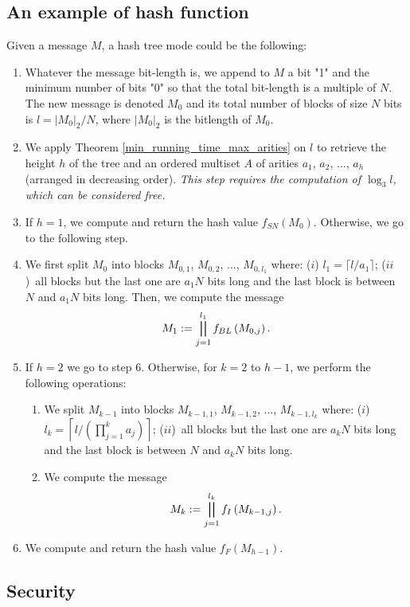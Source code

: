 \documentclass{llncs}
\begin{document}
\subsection{An example of hash function}
Given a message $M$, a hash tree mode could be the following:
\begin{enumerate}
 \item Whatever the message bit-length is, we append to $M$ a bit "1" and the minimum number of bits "0" so that the total bit-length is a multiple
 of $N$. The new message is denoted $M_0$ and its total number of blocks of size $N$ bits is $l=|M_0|_2/N$, where
 $|M_0|_2$ is the bitlength of $M_0$. 
\item We apply Theorem \ref{min_running_time_max_arities} on $l$ to retrieve the height 
 $h$ of the tree and an ordered multiset $A$ of arities $a_1$, $a_2$, ..., $a_h$ (arranged in decreasing order).
 \emph{This step requires the computation of $\log_3 l$, which can be considered free.}
 \item If $h=1$, we compute and return the hash value $f_{SN}(M_0)$. Otherwise, we go to the following step.
 \item We first split $M_0$ into blocks $M_{0,1}$, $M_{0,2}$, ..., $M_{0,l_1}$ where: ($i$) $l_1=\lceil l/a_1 \rceil$; ($ii$)~all blocks but the last one are
$a_1N$ bits long and the last block is between $N$ and $a_1N$ bits long.
 Then, we compute the message
 \[M_1:= \bigparallel_{j=1}^{l_1} f_{BL}\left(M_{0,j}\right).\]
 \item If $h=2$ we go to step 6. Otherwise, for $k=2$ to $h-1$, we perform the following operations:
 \begin{enumerate}
  \item We split $M_{k-1}$ into blocks $M_{k-1,1}$, $M_{k-1,2}$, ..., $M_{k-1,l_k}$ where: ($i$)~$l_k=\left\lceil l/\left(\prod_{j=1}^k a_j\right) \right\rceil$; 
  ($ii$)~all blocks but the last one are $a_kN$ bits long and the last block is between $N$ and $a_kN$ bits long.
  \item We compute the message 
  \[M_k:= \bigparallel_{j=1}^{l_k} f_{I}\left(M_{k-1,j}\right).\]
 \end{enumerate}
  \item We compute and return the hash value $f_{F}(M_{h-1})$.


\end{enumerate}

\subsection{Security}\label{sec_section}
\end{document}
